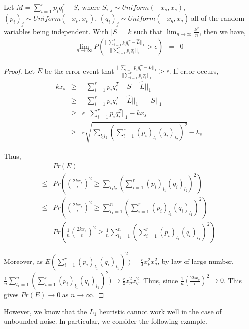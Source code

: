 \begin{prop}
Let $M=\sum_{i=1}^{r}p_{i}q_{i}^{T}+S$, where $S_{i,j}\sim Uniform(-x_{s},x_{s})$,
$(p_{i})_{j}\sim Uniform(-x_{p},x_{p})$, $(q_{i})_{j}\sim Uniform(-x_{q},x_{q})$
all of the random variables being independent. With $|S|=k$ such that
$\lim_{n\to\infty}\frac{k^{2}}{n}$, then we have,
\begin{eqnarray*}
\lim_{n\to\infty}P(\frac{||\sum_{i=1}^{r}p_{i}q_{i}^{T}-\hat{L}||_{1}}{||\sum_{i=1}^{r}p_{i}q_{i}^{T}||_{1}}>\epsilon) & = & 0
\end{eqnarray*}
\end{prop}
\begin{proof}
Let $E$ be the error event that $\frac{||\sum_{i=1}^{r}p_{i}q_{i}^{T}-\hat{L}||_{1}}{||\sum_{i=1}^{r}p_{i}q_{i}^{T}||_{1}}>\epsilon$.
If error occurs,
\begin{eqnarray*}
kx_{s} & \ge & ||\sum_{i=1}^{r}p_{i}q_{i}^{T}+S-\hat{L}||_{1}\\
 & \ge & ||\sum_{i=1}^{r}p_{i}q_{i}^{T}-\hat{L}||_{1}-||S||_{1}\\
 & \ge & \epsilon||\sum_{i=1}^{r}p_{i}q_{i}^{T}||_{1}-kx_{s}\\
 & \ge & \epsilon\sqrt{\sum_{l_{1}l_{2}}(\sum_{i=1}^{r}(p_{i})_{l_{1}}(q_{i})_{l_{2}})^{2}}-k_{s}
\end{eqnarray*}


Thus,
\begin{eqnarray*}
 & Pr(E)\\
\le & Pr((\frac{2kx_{s}}{\epsilon})^{2}\ge\sum_{l_{1}l_{2}}(\sum_{i=1}^{r}(p_{i})_{l_{1}}(q_{i})_{l_{2}})^{2})\\
\le & Pr((\frac{2kx_{s}}{\epsilon})^{2}\ge\sum_{l_{1}=1}^{n}(\sum_{i=1}^{r}(p_{i})_{l_{1}}(q_{i})_{l_{1}})^{2})\\
= & Pr(\frac{1}{n}(\frac{2kx_{s}}{\epsilon})^{2}\ge\frac{1}{n}\sum_{l_{1}=1}^{n}(\sum_{i=1}^{r}(p_{i})_{l_{1}}(q_{i})_{l_{1}})^{2})
\end{eqnarray*}


Moreover, as $E(\sum_{i=1}^{r}(p_{i})_{l_{1}}(q_{i})_{l_{1}})^{2})=\frac{r}{3}x_{p}^{2}x_{q}^{2}$,
by law of large number, $\frac{1}{n}\sum_{l_{1}=1}^{n}(\sum_{i=1}^{r}(p_{i})_{l_{1}}(q_{i})_{l_{1}})^{2})\to\frac{r}{3}x_{p}^{2}x_{q}^{2}$.
Thus, since $\frac{1}{n}(\frac{2kx_{s}}{\epsilon})^{2}\to0$. This
gives $Pr(E)\to0$ as $n\to\infty$.
\end{proof}

However, we know that the $L_1$ heuristic cannot work well in the case of unbounded noise. In particular, we consider the following example. 

